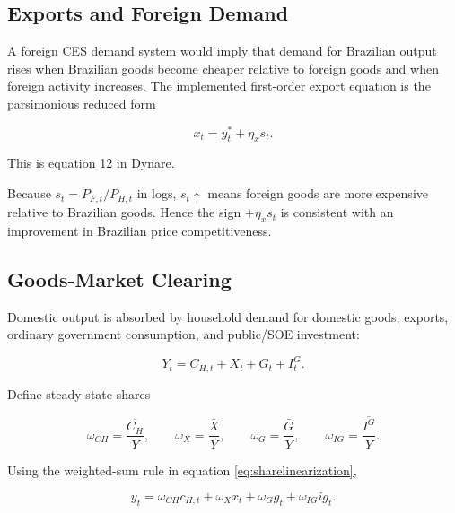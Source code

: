 \subsection{Exports and Foreign Demand}
\label{app:exports}

A foreign CES demand system would imply that demand for Brazilian output rises
when Brazilian goods become cheaper relative to foreign goods and when foreign
activity increases. The implemented first-order export equation is the
parsimonious reduced form

\begin{equation}
\boxed{
x_t
=
y_t^{*}+\eta_xs_t.
}
\label{eq:exports_final}
\end{equation}

This is equation 12 in Dynare.

Because \(s_t=P_{F,t}/P_{H,t}\) in logs, \(s_t\uparrow\) means foreign goods are
more expensive relative to Brazilian goods. Hence the sign \(+\eta_xs_t\) is
consistent with an improvement in Brazilian price competitiveness.

\subsection{Goods-Market Clearing}
\label{app:goodsmarket}

Domestic output is absorbed by household demand for domestic goods, exports,
ordinary government consumption, and public/SOE investment:

\begin{equation}
Y_t
=
C_{H,t}
+
X_t
+
G_t
+
I_t^G.
\label{eq:goods_level}
\end{equation}

Define steady-state shares

\begin{equation}
\omega_{CH}
=
\frac{\overline{C_H}}{\bar Y},
\qquad
\omega_X
=
\frac{\bar X}{\bar Y},
\qquad
\omega_G
=
\frac{\bar G}{\bar Y},
\qquad
\omega_{IG}
=
\frac{\overline{I^G}}{\bar Y}.
\end{equation}

Using the weighted-sum rule in equation \eqref{eq:sharelinearization},

\begin{equation}
\boxed{
y_t
=
\omega_{CH}c_{H,t}
+
\omega_Xx_t
+
\omega_Gg_t
+
\omega_{IG}ig_t.
}
\label{eq:goods_final}
\end{equation}

